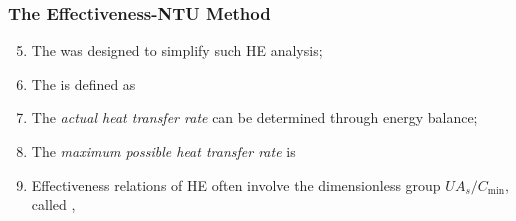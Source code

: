 \documentclass[10pt,compress,unknownkeysallowed]{beamer}
\begin{document}
\begin{frame}
  \frametitle{The Effectiveness-NTU Method}
     \begin{enumerate}\setcounter{enumi}{4}
          \item<1-> The  was designed to simplify such HE analysis;
          \item<2-> The  is defined as
          \item<2-> The {\it actual heat transfer rate} can be determined through energy balance;
          \item<3-> The {\it maximum possible heat transfer rate} is
          \item<4-> Effectiveness relations of HE often involve the dimensionless group $UA_{s}/C_{\text{min}}$, called ,
     \end{enumerate}

\end{frame}
\end{document}
